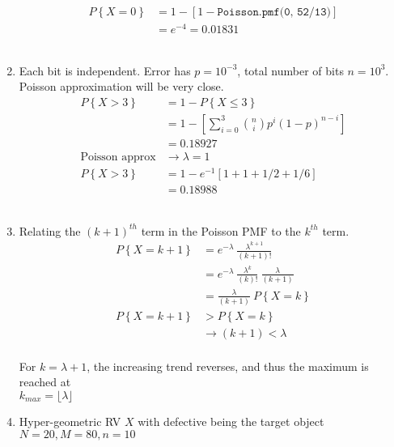 \begin{enumerate}
		\begin{align}
			P \left\{X = 0 \right\} &= 1 - [1 - \texttt{Poisson.pmf(0, 52/13)}] \nonumber \\
			&= e^{-4} = 0.01831
		\end{align}\\
	 
	
	\item Each bit is independent. Error has $ p = 10^{-3} $, total number of bits $ n = 10^3 $. Poisson approximation will be very close. \\
	
		\begin{align}
			P \left\{X > 3 \right\} &= 1 - P \left\{X \leq 3 \right\} \nonumber \\
			&= 1 - \left[\sum\limits_{i = 0}^{3} \binom{n}{i} p^i (1-p)^{n-i}\right] \nonumber \\
			&= 0.18927 \\
			\text{Poisson approx} &\to \lambda = 1 \\
			P \left\{X > 3 \right\} &= 	1 - e^{-1}\left[1 + 1 + 1/2 + 1/6 \right] \nonumber \\
			&= 0.18988
		\end{align}\\
	 
	
	\item Relating the $ (k+1)^{th} $ term in the Poisson PMF to the $ k^{th} $ term. \\
	
		\begin{align}
			P \left\{X = k+1 \right\} &= e^{-\lambda}\ \frac{\lambda^{k+1}}{(k+1)!} \nonumber \\
			&= e^{-\lambda}\ \frac{\lambda^{k}}{(k)!}\ \frac{\lambda}{(k+1)} \\
			&= \frac{\lambda}{(k+1)}\ P \left\{X = k \right\} \nonumber \\
			P \left\{X = k+1 \right\} &> P \left\{X = k \right\} \nonumber \\
			&\to (k+1) < \lambda
		\end{align}\\
	 
	For $ k = \lambda + 1 $, the increasing trend reverses, and thus the maximum is reached at \\ $ k_{max} = \lfloor \lambda \rfloor $\\
	
	\item Hyper-geometric RV $ X $ with defective being the target object $ N = 20, M = 80, n = 10 $\\
	

\end{enumerate}

